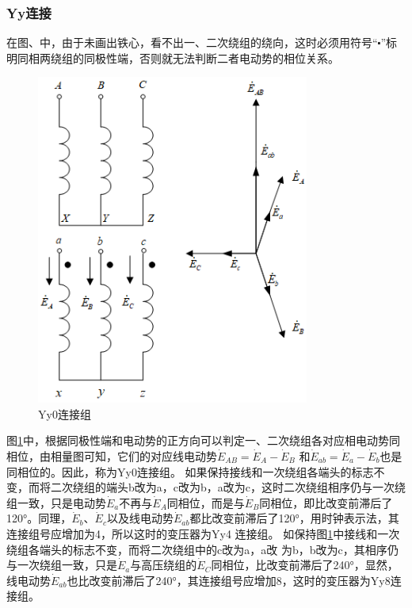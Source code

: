 \documentclass{book}
\begin{document}
\subsubsection{Yy连接}

在图、中，由于未画出铁心，看不出一、二次绕组的绕向，这时必须用符号“$\centerdot $”标明同相两绕组的同极性端，否则就无法判断二者电动势的相位关系。
\begin{figure}[H]
	\centering
	\includegraphics[width=0.80\textwidth]{4-6g.png}
	\caption{Yy0连接组}
	\label{fig_4.6}
\end{figure}
图\ref{fig_4.6}中，根据同极性端和电动势的正方向可以判定一、二次绕组各对应相电动势同 相位，由相量图可知，它们的对应线电动势${{\dot{E}}_{AB}}={{\dot{E}}_{A}}-{{\dot{E}}_{B}}$ 和${{\dot{E}}_{ab}}={{\dot{E}}_{a}}-{{\dot{E}}_{b}}$也是同相位的。因此，称为Yy0连接组。
如果保持接线和一次绕组各端头的标志不变，而将二次绕组的端头b改为a，c改为b，a改为c，这时二次绕组相序仍与一次绕组一致，只是电动势${{\dot{E}}_{a}}$不再与${{\dot{E}}_{A}}$同相位，而是与${{\dot{E}}_{B}}$同相位，即比改变前滞后了120°。同理，${{\dot{E}}_{b}}$、${{\dot{E}}_{c}}$以及线电动势${{\dot{E}}_{ab}}$都比改变前滞后了120°，用时钟表示法，其连接组号应增加为4，所以这时的变压器为Yy4 连接组。
如保持图\ref{fig_4.6}中接线和一次绕组各端头的标志不变，而将二次绕组中的c改为a，a改 为b，b改为c，其相序仍与一次绕组一致，只是${{\dot{E}}_{a}}$与高压绕组的${{\dot{E}}_{C}}$同相位，比改变前滞后了240°，显然，线电动势${{\dot{E}}_{ab}}$也比改变前滞后了240°，其连接组号应增加8，这时的变压器为Yy8连接组。
\end{document}

